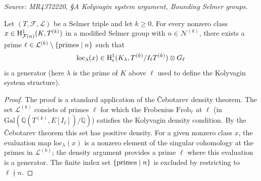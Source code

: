 \begin{lemma}
  \label{lem:cebotarev-kolyvagin}
  \textit{Source: MR4372220, §A Kolyvagin system argument, Bounding Selmer groups.}

  Let \((T, \mathcal{F}, \mathcal{L})\) be a Selmer triple and let \(k \geq 0\). For every nonzero class \(x \in \mathrm{H}^1_{\mathcal{F}(n)}(K, T^{(k)})\) in a modified Selmer group with \(n \in \mathcal{N}^{(k)}\), there exists a prime \(\ell \in \mathcal{L}^{(k)} \setminus \{{\rm primes} \mid n\}\) such that
  \[
    \mathrm{loc}_\lambda(x) \in \mathrm{H}^1_{\mathrm{s}}(K_\lambda, T^{(k)}/I_\ell T^{(k)}) \otimes G_\ell
  \]
  is a generator (here \(\lambda\) is the prime of \(K\) above \(\ell\) used to define the Kolyvagin system structure).
\end{lemma}

\begin{proof}
  The proof is a standard application of the Čebotarev density theorem. The set \(\mathcal{L}^{(k)}\) consists of primes \(\ell\) for which the Frobenius \(\mathrm{Frob}_\ell\) at \(\ell\) (in \(\mathrm{Gal}(\mathbb{Q}(T^{(k)}, E[I_\ell])/\mathbb{Q})\)) satisfies the Kolyvagin density condition. By the Čebotarev theorem this set has positive density. For a given nonzero class \(x\), the evaluation map \(\mathrm{loc}_\lambda(x)\) is a nonzero element of the singular cohomology at the primes in \(\mathcal{L}^{(k)}\); the density argument provides a prime \(\ell\) where this evaluation is a generator. The finite index set \(\{{\rm primes} \mid n\}\) is excluded by restricting to \(\ell\nmid n\).
\end{proof}

